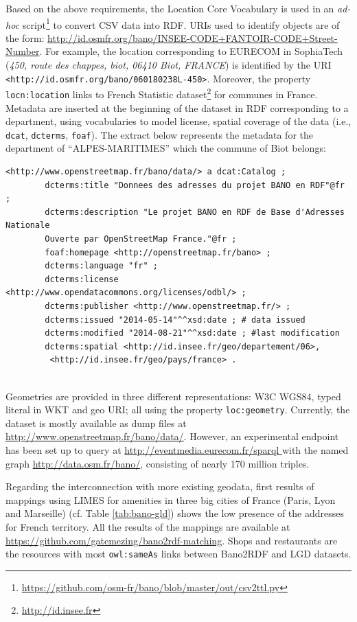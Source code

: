 Based on the above requirements, the Location Core Vocabulary \cite{locnvocab} is used in an \textit{ad-hoc} script\footnote{\url{https://github.com/osm-fr/bano/blob/master/out/csv2ttl.py}} to convert CSV data into RDF. URIs used to identify objects are of the form: \url{http://id.osmfr.org/bano/INSEE-CODE+FANTOIR-CODE+Street-Number}. For example, the location corresponding to EURECOM in SophiaTech (\textit{450, route des chappes, biot, 06410 Biot, FRANCE}) is identified by the URI \\
\texttt{<http://id.osmfr.org/bano/060180238L-450>}. Moreover, the property \\ \texttt{locn:location} links to French Statistic dataset\footnote{\url{http://id.insee.fr}} for communes in France. Metadata are inserted at the beginning of the dataset in RDF corresponding to a department, using vocabularies to model license, spatial coverage of the data (i.e., \texttt{dcat}, \texttt{dcterms}, \texttt{foaf}). The extract below represents the metadata for the department of ``ALPES-MARITIMES'' which the commune of Biot belongs:

\begin{verbatim}
<http://www.openstreetmap.fr/bano/data/> a dcat:Catalog ;
		dcterms:title "Donnees des adresses du projet BANO en RDF"@fr ;
		dcterms:description "Le projet BANO en RDF de Base d'Adresses Nationale 
		Ouverte par OpenStreetMap France."@fr ;
		foaf:homepage <http://openstreetmap.fr/bano> ;
		dcterms:language "fr" ;
		dcterms:license <http://www.opendatacommons.org/licenses/odbl/> ;
		dcterms:publisher <http://www.openstreetmap.fr/> ; 
		dcterms:issued "2014-05-14"^^xsd:date ; # data issued
		dcterms:modified "2014-08-21"^^xsd:date ; #last modification
		dcterms:spatial <http://id.insee.fr/geo/departement/06>,
		 <http://id.insee.fr/geo/pays/france> .
		
\end{verbatim}   

Geometries are provided in three different representations: W3C WGS84, typed literal in WKT and geo URI; all using the property \texttt{loc:geometry}. Currently, the dataset is mostly available as dump files at \url{http://www.openstreetmap.fr/bano/data/}. However, an experimental endpoint has been set up to query at \url{http://eventmedia.eurecom.fr/sparql } with the named graph \url{http://data.osm.fr/bano/}, consisting of nearly 170 million triples. 

Regarding the interconnection with more existing geodata, first results of mappings using LIMES for amenities in three big cities of France (Paris, Lyon and Marseille) (cf. Table \ref{tab:bano-gld}) shows the low presence of the addresses for French territory. All the results of the mappings are available at \url{https://github.com/gatemezing/bano2rdf-matching}. Shops and restaurants are the resources with most \texttt{owl:sameAs} links between Bano2RDF and LGD datasets.


